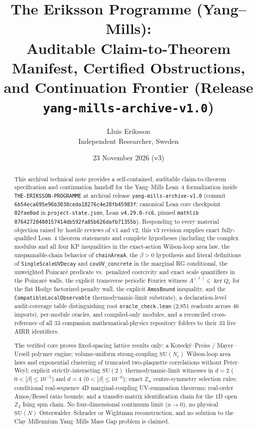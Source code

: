 \documentclass[11pt]{article}
\title{The Eriksson Programme (Yang--Mills):\\
Auditable Claim-to-Theorem Manifest, Certified Obstructions,\\
and Continuation Frontier (Release \texttt{yang-mills-archive-v1.0})}
\author{Lluis Eriksson\\
\small Independent Researcher, Sweden}
\date{23 November 2026 (v3)}
\newcommand{\Z}{\mathbb{Z}}
\begin{document}
\maketitle

\begin{abstract}
This archival technical note provides a self-contained, auditable claim-to-theorem
specification and continuation handoff for the Yang--Mills Lean~4 formalization inside
\texttt{THE-ERIKSSON-PROGRAMME} at archival release \texttt{yang-mills-archive-v1.0}
(commit \texttt{6b54eca695e96b3038ceda18276c4e28fb45983f}; canonical Lean core checkpoint
\texttt{02fae0ad} in \texttt{project-state.json}, Lean \texttt{v4.29.0-rc6}, pinned
\texttt{mathlib} \texttt{07642720480157414db592fa85b626dafb71355b}). Responding to every
material objection raised by hostile reviews of v1 and v2, this v3 revision supplies exact
fully-qualified Lean~4 theorem statements and complete hypotheses (including the complex
modulus and all four KP inequalities in the exact-action Wilson-loop area law, the
unspannable-chain behavior of \texttt{chainAreaA}, the $\beta > 0$ hypothesis and literal
definitions of \texttt{SingleScaleUVDecay} and \texttt{covUV\_concrete} in the marginal RG
conditional, the unweighted Poincar\'e predicate vs.\ penalized coercivity and exact scale
quantifiers in the Poincar\'e walls, the explicit transverse periodic Fourier witness
$A^{(\ell)} \in \ker Q_\ell$ for the flat Hodge factorized-penalty wall, the explicit
\texttt{AmosBound} inequality, and the \texttt{CompatibleLocalObservable} thermodynamic-limit
substrate), a declaration-level audit-coverage table distinguishing root
\texttt{oracle\_check.lean} (2,851 readouts across 46 imports), per-module oracles, and
compiled-only modules, and a reconciled cross-reference of all 33 companion
mathematical-physics repository folders to their 33 live AIRR identifiers.

The verified core proves fixed-spacing lattice results only: a Koteck\'y--Preiss /
Mayer--Ursell polymer engine; volume-uniform strong-coupling $\mathrm{SU}(N_c)$ Wilson-loop
area laws and exponential clustering of truncated two-plaquette correlations without
Peter--Weyl; explicit strictly-interacting $\mathrm{SU}(2)$ thermodynamic-limit witnesses in
$d=2$ ($0 < |\beta| \le 10^{-5}$) and $d=4$ ($0 < |\beta| \le 10^{-6}$); exact $\Z_n$
centre-symmetry selection rules; conditional real-sequence 4D marginal-coupling UV-summation
theorems; real-order Amos/Bessel ratio bounds; and a transfer-matrix identification chain
for the 1D open $\Z_2$ Ising spin chain. No four-dimensional continuum limit ($a \to 0$),
no physical $\mathrm{SU}(N)$ Osterwalder--Schrader or Wightman reconstruction, and no
solution to the Clay Millennium Yang--Mills Mass Gap problem is claimed.
\end{abstract}
\end{document}

